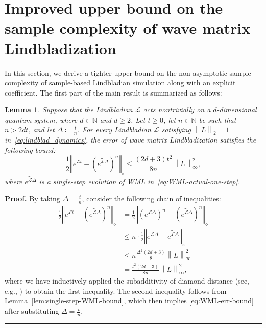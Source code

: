 \documentclass[superscriptaddress,amsmath,amssymb,aps,pra,letterpaper,tightenlines,notitlepages,12pt]{revtex4-2}
\newtheorem{lemma}[theorem]{Lemma}
\newenvironment{proof}[1][Proof]{\noindent\textbf{#1.} }{\ \rule{0.5em}{0.5em}}
\begin{document}
\section{Improved upper bound on the sample complexity of wave matrix Lindbladization} \label{sec:upper-bound-WML}
In this section, we derive a tighter upper bound on the non-asymptotic sample complexity of sample-based Lindbladian simulation along with an explicit coefficient. The first part of the main result is summarized as follows:
\begin{lemma} \label{Thm: error bound WML}
Suppose that the Lindbladian $\mathcal{L}$ acts nontrivially on a $d$-dimensional quantum system, where $d\in \mathbb{N}$ and $d\geq 2$. Let $t\geq0$, let $n\in\mathbb{N}$ be such that $n>2dt$, and let $\Delta\coloneqq\frac{t}{n}$. 
For every Lindbladian $\mathcal{L}$ satisfying $\left\|L\right\|_2=1$ in~\eqref{eq:lindblad_dynamics}, the error of wave matrix Lindbladization satisfies the following bound:
    \begin{equation} \label{eq:WML-err-bound}
        \frac{1}{2} \left\Vert e^{\mathcal{L}t}-\left(  \widetilde{e^{\mathcal{L}\Delta}}\right)
        ^{n}\right\Vert _{\diamond}\leq\frac{(2d+3)t^2}{8n}\left\|L\right\|_\infty^2,
    \end{equation}
where $\widetilde{e^{\mathcal{L}\Delta}}$ is a single-step evolution of WML in~\eqref{eq:WML-actual-one-step}. 
\end{lemma}

\begin{proof}
By taking $\Delta = \frac{t}{n}$, consider the following chain of inequalities:
\begin{align}
\frac{1}{2} \left\Vert e^{\mathcal{L}t}-\left(  \widetilde{e^{\mathcal{L}\Delta}}\right)
^{n}\right\Vert _{\diamond} &  = \frac{1}{2} \left\Vert \left(  e^{\mathcal{L}\Delta
}\right)  ^{n}-\left(  \widetilde{e^{\mathcal{L}\Delta}}\right)
^{n}\right\Vert _{\diamond}\\
&  \leq n \cdot \frac{1}{2}  \left\Vert e^{\mathcal{L}\Delta}-\widetilde{e^{\mathcal{L}\Delta}
}\right\Vert _{\diamond}\\
&  \leq n\frac{\Delta^2(2d+3)}{8} \left\|L\right\|_\infty^2  \\
&  =\frac{t^2(2d+3)}{8n} \left\|L\right\|_\infty^2,
\end{align}
where we have inductively applied the subadditivity of diamond distance (see, e.g., \cite[Appendix~B]{go2025SamplebasedHamiltonianLindbladian}) to obtain the first inequality. The second inequality follows from
Lemma~\ref{lem:single-step-WML-bound}, which then implies
\eqref{eq:WML-err-bound} after substituting $\Delta=\frac{t}{n}$.
\end{proof}
\end{document}
